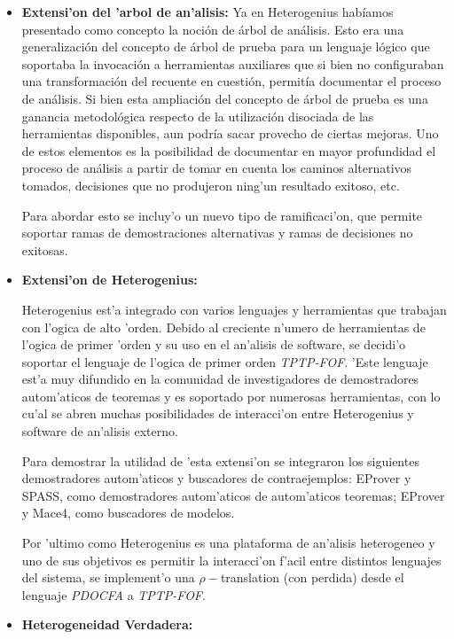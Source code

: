 \begin{itemize}
\item \textbf{Extensi'on del 'arbol de an'alisis:} Ya en Heterogenius habíamos presentado como concepto la noción de árbol de análisis. Esto era una generalización del concepto de árbol de prueba para un lenguaje lógico que soportaba la invocación a herramientas auxiliares que si bien no configuraban una transformación del recuente en cuestión, permitía documentar el proceso de análisis. Si bien esta ampliación del concepto de árbol de prueba es una ganancia metodológica respecto de la utilización disociada de las herramientas disponibles, aun podría sacar provecho de ciertas mejoras. Uno de estos elementos es la posibilidad de documentar en mayor profundidad el proceso de análisis a partir de tomar en cuenta los caminos alternativos tomados, decisiones que no produjeron ning'un resultado exitoso, etc.

Para abordar esto se incluy'o un nuevo tipo de ramificaci'on, que permite soportar ramas de demostraciones alternativas y ramas de decisiones no exitosas.

\item \textbf{Extensi'on de Heterogenius:}

Heterogenius est'a integrado con varios lenguajes y herramientas que trabajan con l'ogica de alto 'orden. Debido al creciente n'umero de herramientas de l'ogica de primer 'orden y su uso en el an'alisis de software, se decidi'o soportar el lenguaje de l'ogica de primer orden \textit{TPTP-FOF}. 'Este lenguaje est'a muy difundido en la comunidad de investigadores de demostradores autom'aticos de teoremas y es soportado por numerosas herramientas, con lo cu'al se abren muchas posibilidades de interacci'on entre Heterogenius y software de an'alisis externo. 

Para demostrar la utilidad de 'esta extensi'on se integraron los siguientes demostradores autom'aticos y buscadores de contraejemplos: EProver y SPASS, como demostradores autom'aticos de autom'aticos teoremas; EProver y Mace4, como buscadores de modelos. 

Por 'ultimo como Heterogenius es una plataforma de an'alisis heterogeneo y uno de sus objetivos es permitir la interacci'on f'acil entre distintos lenguajes del sistema, se implement'o una $\rho-$translation (con perdida) desde el lenguaje \textit{PDOCFA} a \textit{TPTP-FOF}.


\item \textbf{Heterogeneidad Verdadera:}


\end{itemize}
